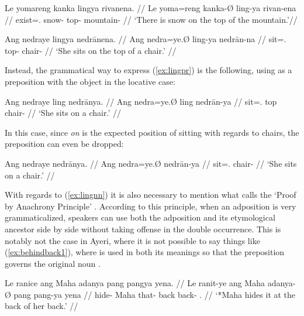 \pex
\a\label{ex:lingnn}\begingl
	\gla Le yomareng kanka lingya rivanena. //
	\glb Le yoma=reng kanka-Ø ling-ya rivan-ena //
	\glc \PatTI{} exist=\TsgI{}.\Aarg{} snow-\Top{} top-\Loc{}
		mountain-\Gen{} //
	\glft `There is snow on the top of the mountain.'\footnotemark //
\endgl

\a\label{ex:lingpr}\ljudge* \begingl
	\gla Ang nedraye lingya nedrānena. //
	\glb Ang nedra=ye.Ø ling-ya nedrān-na //
	\glc \AgtT{} sit=\TsgF{}.\Top{} top-\Loc{} chair-\Gen{} //
	\glft `\ques{}She sits on the top of a chair.' //
\endgl

\xe


\noindent Instead, the grammatical way to express (\ref{ex:lingpr}) is the 
following, using  as a preposition with the object in the 
locative case:

\ex\begingl
	\gla Ang nedraye ling nedrānya. //
	\glb Ang nedra=ye.Ø ling nedrān-ya //
	\glc \AgtT{} sit=\TsgF{}.\Top{} top chair-\Loc{} //
	\glft `She sits on a chair.' //
\endgl\xe

In this case, since \emph{on} is the expected position of sitting with regards 
to chairs, the preposition can even be dropped:

\ex\begingl
	\gla Ang nedraye nedrānya. //
	\glb Ang nedra=ye.Ø nedrān-ya //
	\glc \AgtT{} sit=\TsgF{}.\Top{} chair-\Loc{} //
	\glft `She sits on a chair.' //
\endgl\xe

With regards to (\ref{ex:lingnn}) it is also necessary to mention what 
\citeauthor{hagege2010} calls the `Proof by Anachrony Principle' 
\citep[158--159]{hagege2010}. According to this principle, when an adposition 
is very grammaticalized, speakers can use both the adposition and its 
etymological ancestor side by side without taking offense in the double 
occurrence. This is notably not the case in Ayeri, where it is not possible to 
say things like (\ref{ex:behindback1}), where  is used in both 
its meanings so that the preposition  governs the 
original noun .

\pex
\a\label{ex:behindback1}\ljudge* \begingl
	\gla Le ranice ang Maha adanya pang pangya yena. //
	\glb Le ranit-ye ang Maha adanya-Ø pang pang-ya yena //
	\glc \PatTI{} hide-\TsgF{} \Aarg{} Maha that-\Top{} back back-\Loc{} 
		\TsgF{}.\Gen{} //
	\glft `*Maha hides it at the back of her back.' //
\endgl

